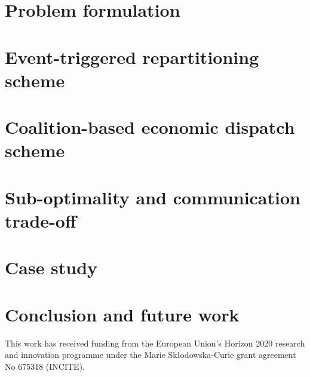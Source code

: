\documentclass[twocolumn]{autart}    %
\begin{document}
\section{Problem formulation}
\label{sec:prob_form}


\section{Event-triggered repartitioning scheme}
\label{sec:rep_sch}


\section{Coalition-based economic dispatch scheme}
\label{sec:nc_ed}


\section{Sub-optimality and communication trade-off}
\label{sec:opt}


\section{Case study}
\label{sec:case_st}


\section{Conclusion and future work}
\label{sec:concl}

\vspace{-10pt}
\begin{ack}                               %
This work has received funding from the European Union's Horizon 2020 research and innovation programme under the Marie Sk\l{}odowska-Curie grant agreement No 675318 (INCITE).  %
\end{ack}
\vspace{-10pt}
{%

}                                %


\end{document}
